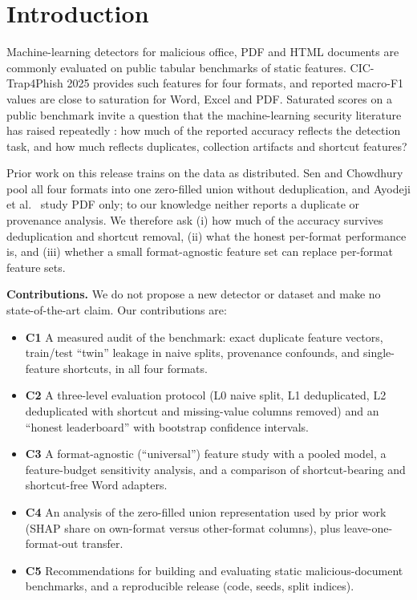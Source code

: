 \documentclass[conference]{IEEEtran}
\begin{document}
\section{Introduction}
Machine-learning detectors for malicious office, PDF and HTML documents are commonly evaluated on public tabular benchmarks of static features. CIC-Trap4Phish 2025 \cite{nejati2026} provides such features for four formats, and reported macro-F1 values are close to saturation for Word, Excel and PDF. Saturated scores on a public benchmark invite a question that the machine-learning security literature has raised repeatedly \cite{arp2022,kapoor2023,allamanis2019,geirhos2020}: how much of the reported accuracy reflects the detection task, and how much reflects duplicates, collection artifacts and shortcut features?

Prior work on this release trains on the data as distributed. Sen and Chowdhury \cite{sen2026} pool all four formats into one zero-filled union without deduplication, and Ayodeji et al.\ \cite{ayodeji2026} study PDF only; to our knowledge neither reports a duplicate or provenance analysis. We therefore ask (i) how much of the accuracy survives deduplication and shortcut removal, (ii) what the honest per-format performance is, and (iii) whether a small format-agnostic feature set can replace per-format feature sets.

\textbf{Contributions.} We do not propose a new detector or dataset and make no state-of-the-art claim. Our contributions are:
\begin{itemize}
\item \textbf{C1} A measured audit of the benchmark: exact duplicate feature vectors, train/test ``twin'' leakage in naive splits, provenance confounds, and single-feature shortcuts, in all four formats.
\item \textbf{C2} A three-level evaluation protocol (L0 naive split, L1 deduplicated, L2 deduplicated with shortcut and missing-value columns removed) and an ``honest leaderboard'' with bootstrap confidence intervals.
\item \textbf{C3} A format-agnostic (``universal'') feature study with a pooled model, a feature-budget sensitivity analysis, and a comparison of shortcut-bearing and shortcut-free Word adapters.
\item \textbf{C4} An analysis of the zero-filled union representation used by prior work (SHAP share on own-format versus other-format columns), plus leave-one-format-out transfer.
\item \textbf{C5} Recommendations for building and evaluating static malicious-document benchmarks, and a reproducible release (code, seeds, split indices).
\end{itemize}
\end{document}
